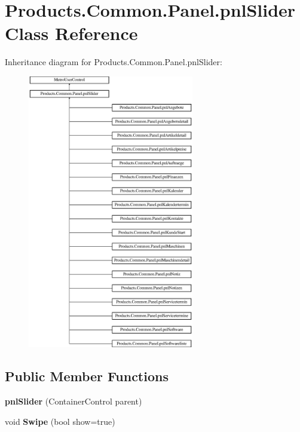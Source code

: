\hypertarget{class_products_1_1_common_1_1_panel_1_1pnl_slider}{}\section{Products.\+Common.\+Panel.\+pnl\+Slider Class Reference}
\label{class_products_1_1_common_1_1_panel_1_1pnl_slider}
Inheritance diagram for Products.\+Common.\+Panel.\+pnl\+Slider\+:\begin{figure}[H]
\begin{center}
\leavevmode
\includegraphics[height=12.000000cm]{class_products_1_1_common_1_1_panel_1_1pnl_slider}
\end{center}
\end{figure}
\subsection*{Public Member Functions}
\begin{DoxyCompactItemize}
\item 
{\bfseries pnl\+Slider} (Container\+Control parent)\hypertarget{class_products_1_1_common_1_1_panel_1_1pnl_slider_a2209356e49a7226b012faf84a4eb37ca}{}\label{class_products_1_1_common_1_1_panel_1_1pnl_slider_a2209356e49a7226b012faf84a4eb37ca}

\item 
void {\bfseries Swipe} (bool show=true)\hypertarget{class_products_1_1_common_1_1_panel_1_1pnl_slider_a4c867ebeb17dca79121a4edd98343f77}{}\label{class_products_1_1_common_1_1_panel_1_1pnl_slider_a4c867ebeb17dca79121a4edd98343f77}

\end{DoxyCompactItemize}
